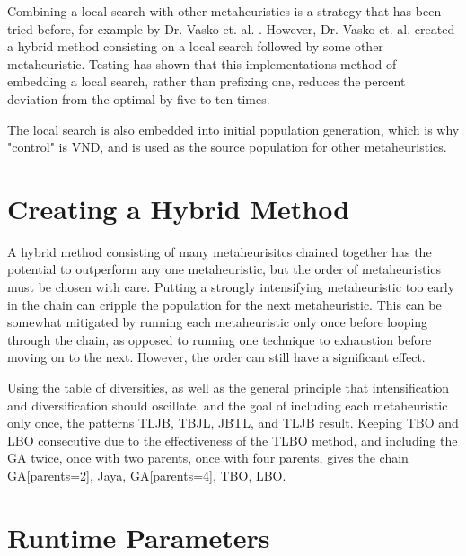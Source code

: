 \documentclass[11pt, letterpaper, onecolumn]{article}
\begin{document}
\begin{table}[htbp]
\end{table}

Combining a local search with other metaheuristics is a strategy that has been tried before, for example by Dr. Vasko et. al. \cite{mmkp}. However, Dr. Vasko et. al. created a hybrid method consisting on a local search followed by some other metaheuristic. Testing has shown that this implementations method of embedding a local search, rather than prefixing one, reduces the percent deviation from the optimal by five to ten times. 

The local search is also embedded into initial population generation, which is why "control" is VND, and is used as the source population for other metaheuristics. 

\section{Creating a Hybrid Method}

A hybrid method consisting of many metaheurisitcs chained together has the potential to outperform any one metaheuristic, but the order of metaheuristics must be chosen with care. Putting a strongly intensifying metaheuristic too early in the chain can cripple the population for the next metaheuristic. This can be somewhat mitigated by running each metaheuristic only once before looping through the chain, as opposed to running one technique to exhaustion before moving on to the next. However, the order can still have a significant effect. 

Using the table of diversities, as well as the general principle that intensification and diversification should oscillate, and the goal of including each metaheuristic only once, the patterns TLJB, TBJL, JBTL, and TLJB result. Keeping TBO and LBO consecutive due to the effectiveness of the TLBO method, and including the GA twice, once with two parents, once with four parents, gives the chain GA[parents=2], Jaya, GA[parents=4], TBO, LBO.  


\section{Runtime Parameters}
\end{document}
